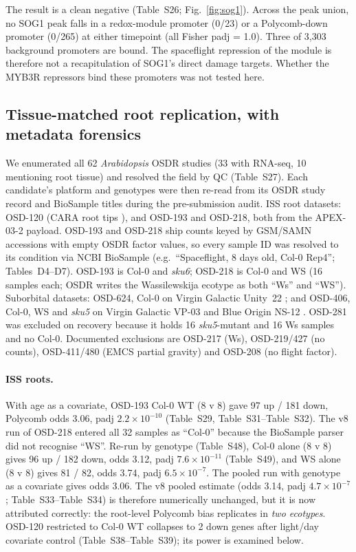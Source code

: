 \documentclass[11pt,a4paper]{article}
\newcommand{\Sx}[1]{Table~S#1}
\begin{document}
The result is a clean negative (\Sx{26}; Fig.~\ref{fig:sog1}). Across the peak union,
no SOG1 peak falls in a redox-module promoter (0/23) or a Polycomb-down promoter (0/265)
at either timepoint (all Fisher padj = 1.0). Three of 3,303 background promoters are
bound. The spaceflight repression of the module is therefore not a recapitulation
of SOG1's direct damage targets. Whether the MYB3R repressors bind these promoters was not tested here.

\subsection{Tissue-matched root replication, with metadata forensics}

We enumerated all 62 \textit{Arabidopsis} OSDR studies (33 with RNA-seq, 10 mentioning root
tissue) and resolved the field by QC (\Sx{27}). Each candidate's platform and genotypes were then re-read
from its OSDR study record and BioSample titles during the pre-submission audit. ISS root datasets:
OSD-120 (CARA root tips \citep{paul2017genetic}), and OSD-193 \citep{califar2020root} and OSD-218, both from the
APEX-03-2 payload. OSD-193 and OSD-218 ship counts keyed by GSM/SAMN accessions with empty OSDR factor values,
so every sample ID was resolved to its condition via NCBI BioSample (e.g.\ ``Spaceflight, 8 days old, Col-0
Rep4''; Tables~D4--D7). OSD-193 is Col-0 and \textit{sku6}; OSD-218 is Col-0 and WS (16 samples each; OSDR writes the
Wassilewskija ecotype as both ``Ws'' and ``WS'').
Suborbital datasets: OSD-624, Col-0 on Virgin Galactic Unity~22 \citep{ferl2023virgin}; and OSD-406, Col-0, WS and
\textit{sku5} on Virgin Galactic VP-03 and Blue Origin NS-12 \citep{califar2021suborbital}. OSD-281 was excluded on recovery
because it holds 16 \textit{sku5}-mutant and 16 Ws samples and no Col-0. Documented exclusions are OSD-217 (Ws),
OSD-219/427 (no counts), OSD-411/480 (EMCS partial gravity) and OSD-208 (no flight factor).

\paragraph{ISS roots.} With age as a covariate, OSD-193 Col-0 WT (8 v 8) gave 97 up / 181 down, Polycomb odds 3.06,
padj $2.2\times10^{-10}$ (\Sx{29}, \Sx{31}--\Sx{32}). The v8 run of OSD-218 entered all 32 samples as ``Col-0''
because the BioSample parser did not recognise ``WS''. Re-run by genotype (\Sx{48}), Col-0 alone (8 v 8) gives
96 up / 182 down, odds 3.12, padj $7.6\times10^{-11}$ (\Sx{49}), and WS alone (8 v 8) gives 81 / 82, odds 3.74,
padj $6.5\times10^{-7}$. The pooled run with genotype as a covariate gives odds 3.06. The v8 pooled estimate
(odds 3.14, padj $4.7\times10^{-7}$; \Sx{33}--\Sx{34}) is therefore numerically unchanged, but it is now
attributed correctly: the root-level Polycomb bias replicates in \emph{two ecotypes}. OSD-120 restricted to Col-0 WT
collapses to 2 down genes after light/day covariate control (\Sx{38}--\Sx{39}); its power is examined below.
\end{document}

